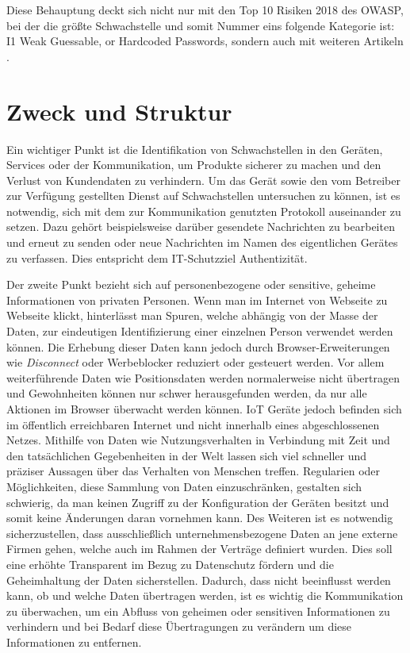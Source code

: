 Diese Behauptung deckt sich nicht nur mit den Top 10 Risiken 2018 des \ac{OWASP}, bei der die größte Schwachstelle und somit Nummer eins folgende Kategorie ist: \glqq I1 Weak Guessable, or Hardcoded Passwords\grqq{}, sondern auch mit weiteren Artikeln \cite{guzman_2019,eckstein_2018}.

\section{Zweck und Struktur}

    Ein wichtiger Punkt ist die Identifikation von Schwachstellen in den Geräten, Services oder der Kommunikation, um Produkte sicherer zu machen und den Verlust von Kundendaten zu verhindern.
    Um das Gerät sowie den vom Betreiber zur Verfügung gestellten Dienst auf Schwachstellen untersuchen zu können, ist es notwendig, sich mit dem zur Kommunikation genutzten Protokoll auseinander zu setzen. Dazu gehört beispielsweise darüber gesendete Nachrichten zu bearbeiten und erneut zu senden oder neue Nachrichten im Namen des eigentlichen Gerätes zu verfassen. Dies entspricht dem IT-Schutzziel Authentizität.
    
    Der zweite Punkt bezieht sich auf personenbezogene oder sensitive, geheime Informationen von privaten Personen.
    Wenn man im Internet von Webseite zu Webseite klickt, hinterlässt man Spuren, welche abhängig von der Masse der Daten, zur eindeutigen Identifizierung einer einzelnen Person verwendet werden können. %
    Die Erhebung dieser Daten kann jedoch durch Browser-Erweiterungen wie \emph{Disconnect} oder Werbeblocker reduziert oder gesteuert werden. Vor allem weiterführende Daten wie Positionsdaten werden normalerweise nicht übertragen und Gewohnheiten können nur schwer herausgefunden werden, da nur alle Aktionen im Browser überwacht werden können.
    \ac{IoT} Geräte jedoch befinden sich im öffentlich erreichbaren Internet und nicht innerhalb eines abgeschlossenen Netzes. Mithilfe von Daten wie Nutzungsverhalten in Verbindung mit Zeit und den tatsächlichen Gegebenheiten in der Welt lassen sich viel schneller und präziser Aussagen über das Verhalten von Menschen treffen. %
    Regularien oder Möglichkeiten, diese Sammlung von Daten einzuschränken, gestalten sich schwierig, da man keinen Zugriff zu der Konfiguration der Geräten besitzt und somit keine Änderungen daran vornehmen kann.
    Des Weiteren ist es notwendig sicherzustellen, dass ausschließlich unternehmensbezogene Daten an jene externe Firmen gehen, welche auch im Rahmen der Verträge definiert wurden. Dies soll eine erhöhte Transparent im Bezug zu Datenschutz fördern und die Geheimhaltung der Daten sicherstellen.
    Dadurch, dass nicht beeinflusst werden kann, ob und welche Daten übertragen werden, ist es wichtig die Kommunikation zu überwachen, um ein Abfluss von geheimen oder sensitiven Informationen zu verhindern und bei Bedarf diese Übertragungen zu verändern um diese Informationen zu entfernen.
    

